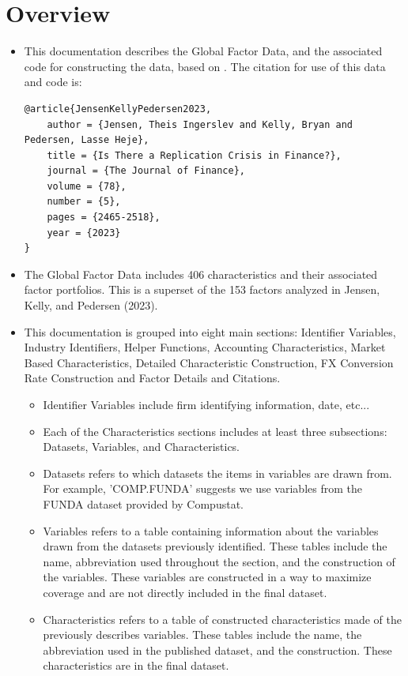 \documentclass[12pt,title,fleqn]{article}
\begin{document}
\section{Overview}
    \begin{itemize}
    \item This documentation describes the Global Factor Data, and the associated code for constructing the data, based on  \cite{JensenKellyPedersen2023}.  The citation for use of this data and code is:
	\begin{verbatim}
@article{JensenKellyPedersen2023,
	author = {Jensen, Theis Ingerslev and Kelly, Bryan and Pedersen, Lasse Heje},
	title = {Is There a Replication Crisis in Finance?},
	journal = {The Journal of Finance},
	volume = {78},
	number = {5},
	pages = {2465-2518},
	year = {2023}
}	
	\end{verbatim}
	\item The Global Factor Data includes 406 characteristics and their associated factor portfolios.  This is a superset of the 153 factors analyzed in Jensen, Kelly, and Pedersen (2023).
        \item This documentation is grouped into eight main sections: Identifier Variables, Industry Identifiers, Helper Functions, Accounting Characteristics, Market Based Characteristics, Detailed Characteristic Construction, FX Conversion Rate Construction and Factor Details and Citations.
            \begin{itemize}
                \item Identifier Variables include firm identifying information, date, etc...
                \item Each of the Characteristics sections includes at least three subsections: Datasets, Variables, and Characteristics.
                \item Datasets refers to which datasets the items in variables are drawn from. For example, 'COMP.FUNDA' suggests we use variables from the FUNDA dataset provided by Compustat. 
                \item Variables refers to a table containing information about the variables drawn from the datasets previously identified. These tables include the name, abbreviation used throughout the section, and the construction of the variables. These variables are constructed in a way to maximize coverage and are not directly included in the final dataset. 
                \item Characteristics refers to a table of constructed characteristics made of the previously describes variables. These tables include the name, the abbreviation used in the published dataset, and the construction. These characteristics are in the final dataset. 
            \end{itemize}
    \end{itemize}
\end{document}
